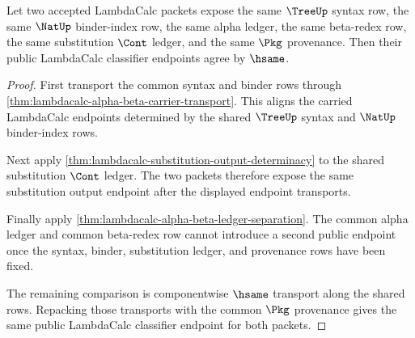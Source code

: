 \begin{theorem}
\label{thm:lambdacalc-alpha-beta-ledger-determinacy}
Let two accepted LambdaCalc packets expose the same $\TreeUp$ syntax row, the
same $\NatUp$ binder-index row, the same alpha ledger, the same beta-redex row,
the same substitution $\Cont$ ledger, and the same $\Pkg$ provenance. Then their
public LambdaCalc classifier endpoints agree by $\hsame$.
\end{theorem}
\begin{proof}
First transport the common syntax and binder rows through
\autoref{thm:lambdacalc-alpha-beta-carrier-transport}. This aligns the carried
LambdaCalc endpoints determined by the shared $\TreeUp$ syntax and $\NatUp$
binder-index rows.

Next apply
\autoref{thm:lambdacalc-substitution-output-determinacy} to the shared
substitution $\Cont$ ledger. The two packets therefore expose the same
substitution output endpoint after the displayed endpoint transports.

Finally apply
\autoref{thm:lambdacalc-alpha-beta-ledger-separation}. The common alpha ledger
and common beta-redex row cannot introduce a second public endpoint once the
syntax, binder, substitution ledger, and provenance rows have been fixed.

The remaining comparison is componentwise $\hsame$ transport along the shared
rows. Repacking those transports with the common $\Pkg$ provenance gives the
same public LambdaCalc classifier endpoint for both packets.
\end{proof}

